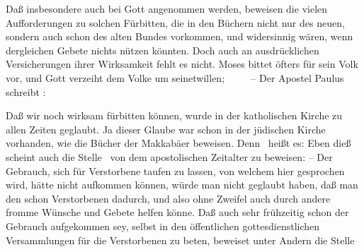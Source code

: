 \begin{aufza}
\item Daß insbesondere auch  bei Gott angenommen werden, beweisen die vielen Aufforderungen zu solchen Fürbitten, die in den Büchern nicht nur des neuen, sondern auch schon des alten Bundes vorkommen, und widersinnig wären, wenn dergleichen Gebete nichts nützen könnten. Doch auch an ausdrücklichen Versicherungen ihrer Wirksamkeit fehlt es nicht. Moses bittet öfters für sein Volk vor, und Gott verzeiht dem Volke um seinetwillen; \zB\ \ \  \udgl\  -- Der Apostel Paulus schreibt : 
\item Daß wir  noch wirksam fürbitten können, wurde in der katholischen Kirche zu allen Zeiten geglaubt. Ja dieser Glaube war schon in der jüdischen Kirche vorhanden, wie die Bücher der Makkabäer beweisen. Denn \ heißt es:  Eben dieß scheint auch die Stelle \ von dem apostolischen Zeitalter zu beweisen:  -- Der Gebrauch, sich für Verstorbene taufen zu lassen, von welchem hier gesprochen wird, hätte nicht aufkommen können, würde man nicht geglaubt haben, daß man den schon Verstorbenen dadurch, und also ohne Zweifel auch durch andere fromme Wünsche und Gebete helfen könne. Daß auch sehr frühzeitig schon der Gebrauch aufgekommen sey, selbst in den öffentlichen gottesdienstlichen Versammlungen für die Verstorbenen zu beten, beweiset unter Andern die Stelle  ~\ 

\end{aufza}
